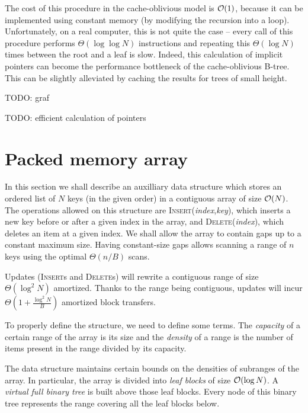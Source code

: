 The cost of this procedure in the cache-oblivious model is $\mathcal{O}(1)$, because
it can be implemented using constant memory (by modifying the recursion into
a loop). Unfortunately, on a real computer, this is not quite the case --
every call of this procedure performs $\Theta(\log\log N)$ instructions and
repeating this $\Theta(\log N)$ times between the root and a leaf is slow.
Indeed, this calculation of implicit pointers can become the performance
bottleneck of the cache-oblivious B-tree.
This can be slightly alleviated by caching the results for trees of small
height.

TODO: graf

TODO: efficient calculation of pointers

\section{Packed memory array}
In this section we shall describe an auxilliary data structure which stores
an ordered list of $N$ keys (in the given order) in a contiguous array of
size $\mathcal{O}(N)$. The operations allowed on this structure are
\textsc{Insert}(\textit{index},\textit{key}), which inserts a new key before
or after a given index in the array, and \textsc{Delete}(\textit{index}),
which deletes an item at a given index.
We shall allow the array to contain gaps up to a constant maximum size.
Having constant-size gaps allows scanning a range of $n$ keys using the
optimal $\Theta(n/B)$ scans.

Updates (\textsc{Insert}s and \textsc{Delete}s) will rewrite a contiguous
range of size $\Theta(\log^2 N)$ amortized. Thanks to the range being
contiguous, updates will incur $\Theta(1+\frac{\log^2 N}{B})$ amortized
block transfers.

To properly define the structure, we need to define some terms. The
\textit{capacity} of a certain range of the array is its size and the
\textit{density} of a range is the number of items present in the range divided
by its capacity.

The data structure maintains certain bounds on the densities of subranges of the array.
In particular, the array is divided into \textit{leaf blocks} of size $\mathcal{O}(\log N)$.
A \textit{virtual full binary tree} is built above those leaf blocks. Every
node of this binary tree represents the range covering all the leaf blocks below.

